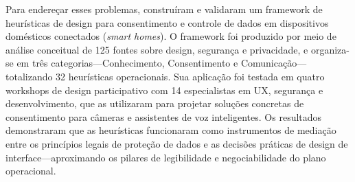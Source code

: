 \documentclass[
	12pt,				%
	oneside,			%
	a4paper,			%
	english,			%
	brazil				%
	]{abntex2ppgsi}
\begin{document}
    Para endereçar esses problemas,  construíram e validaram um framework de heurísticas de design para consentimento e controle de dados em dispositivos domésticos conectados (\textit{smart homes}). O framework foi produzido por meio de análise conceitual de 125 fontes sobre design, segurança e privacidade, e organiza-se em três categorias---Conhecimento, Consentimento e Comunicação---totalizando 32 heurísticas operacionais. Sua aplicação foi testada em quatro workshops de design participativo com 14 especialistas em UX, segurança e desenvolvimento, que as utilizaram para projetar soluções concretas de consentimento para câmeras e assistentes de voz inteligentes. Os resultados demonstraram que as heurísticas funcionaram como instrumentos de mediação entre os princípios legais de proteção de dados e as decisões práticas de design de interface---aproximando os pilares de legibilidade e negociabilidade do plano operacional.
\end{document}
